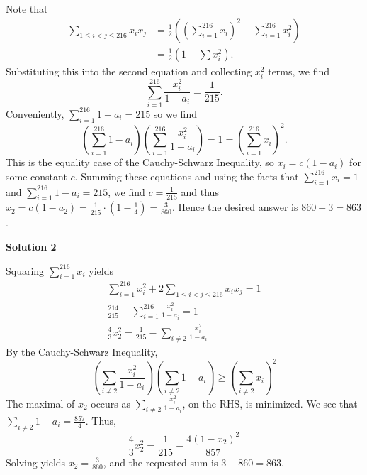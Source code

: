\begin{enumerate}
Note that
 \begin{align*}\sum_{1 \leq i < j \leq 216} x_ix_j &= \frac12\left(\left(\sum_{i=1}^{216} x_i\right)^2-\sum_{i=1}^{216} x_i^2\right)\\&=\frac12\left(1-\sum x_i^2\right).\end{align*}
Substituting this into the second equation and collecting $x_i^2$ terms, we find 
 \[\sum_{i=1}^{216}\frac{x_i^2}{1-a_i}=\frac{1}{215}.\] Conveniently, $\sum_{i=1}^{216} 1-a_i=215$ so we find
 \[\left(\sum_{i=1}^{216} 1-a_i\right)\left(\sum_{i=1}^{216}\frac{x_i^2}{1-a_i}\right)=1=\left(\sum_{i=1}^{216} x_i\right)^2.\] This is the equality case of the Cauchy-Schwarz Inequality, so $x_i=c(1-a_i)$ for some constant $c$. Summing these equations and using the facts that $\sum_{i=1}^{216} x_i=1$ and $\sum_{i=1}^{216} 1-a_i=215$, we find $c=\frac{1}{215}$ and thus $x_2=c(1-a_2)=\frac{1}{215}\cdot \left(1-\frac{1}{4}\right)=\frac{3}{860}$. Hence the desired answer is $860+3=\boxed{863}$.

 



\textbf{Solution 2}

Squaring $\sum_{i=1}^{216}x_i$ yields\begin{gather*}\sum_{i=1}^{216}x_{i}^{2}+2\sum_{1\le i < j\le 216}x_{i}x_{j}=1\\\frac{214}{215}+\sum_{i=1}^{216}\frac{x_{i}^{2}}{1-a_{i}}=1\\\frac{4}{3}x_{2}^{2}=\frac{1}{215}-\sum_{i\neq 2}\frac{x_{i}^2}{1-a_{i}}\end{gather*}By the Cauchy-Schwarz Inequality,
 \[(\sum_{i\neq 2}\frac{x_{i}^2}{1-a_{i}})(\sum_{i\neq 2}1-a_{i})\ge (\sum_{i\neq 2}x_{i})^2\]The maximal of $x_{2}$ occurs as $\sum_{i\neq 2}\frac{x_{i}^2}{1-a_{i}}$, on the RHS, is minimized. We see that $\sum_{i\neq 2}1-a_{i}=\frac{857}{4}$. Thus,
 \[\frac{4}{3}x_{2}^{2}=\frac{1}{215}-\frac{4(1-x_{2})^2}{857}\]Solving yields $x_{2}=\frac{3}{860}$, and the requested sum is $3+860=\boxed{863}$.

 


 


\end{enumerate}